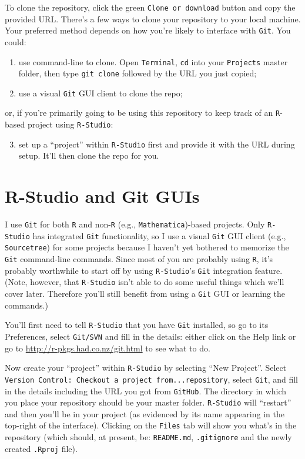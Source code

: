 \documentclass[12pt,letterpaper]{article}
\begin{document}
To clone the repository, click the green \texttt{Clone or download} button and copy the provided URL.
There's a few ways to clone your repository to your local machine.
Your preferred method depends on how you're likely to interface with \texttt{Git}.
You could:
\begin{enumerate}
	\item use command-line to clone.  Open \texttt{Terminal}, \texttt{cd} into your \texttt{Projects} master folder, then type \texttt{git clone} followed by the URL you just copied;
	\item use a visual \texttt{Git} GUI client to clone the repo;
\end{enumerate}
or, if you're primarily going to be using this repository to keep track of an \texttt{R}-based project using \texttt{R-Studio}:
\begin{enumerate}
  \setcounter{enumi}{2}
	\item set up a ``project'' within \texttt{R-Studio} first and provide it with the URL during setup.  It'll then clone the repo for you.
\end{enumerate}

\section{R-Studio and Git GUIs}
I use \texttt{Git} for both \texttt{R} and non-\texttt{R} (e.g.,  \texttt{Mathematica})-based projects.
Only  \texttt{R-Studio} has integrated  \texttt{Git} functionality, so I use a visual  \texttt{Git} GUI client (e.g., \texttt{Sourcetree}) for some projects because I haven't yet bothered to memorize the  \texttt{Git} command-line commands.
Since most of you are probably using \texttt{R}, it's probably worthwhile to start 
off by using \texttt{R-Studio}'s \texttt{Git} integration feature.
(Note, however, that \texttt{R-Studio} isn't able to do some useful things which 
we'll cover later.  Therefore you'll still benefit from using a 
\texttt{Git} GUI or learning the commands.)

You'll first need to tell \texttt{R-Studio} that you have \texttt{Git} installed, so go to its Preferences, select \texttt{Git/SVN} and fill in the details: either click on the Help link or go to
\url{http://r-pkgs.had.co.nz/git.html} to see what to do.

Now create your ``project'' within  \texttt{R-Studio} by selecting ``New Project''.
Select \texttt{Version Control: Checkout a project from...repository}, select 
\texttt{Git}, and fill in the details including the URL you got from \texttt{GitHub}.
The directory in which you place your repository should be your master folder.
\texttt{R-Studio} will ``restart'' and then you'll be in your project (as evidenced by its name appearing in the top-right of the interface).
Clicking on the \texttt{Files} tab will show you what's in the repository (which should, at present, be: \texttt{README.md}, \texttt{.gitignore} and the newly created \texttt{.Rproj} file).
\end{document}

